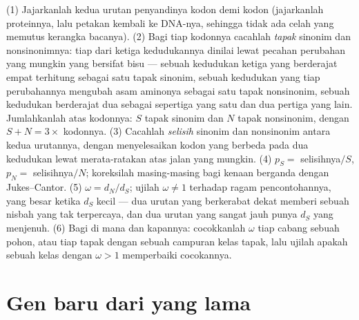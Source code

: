 \begin{method}[Menaksir $d_{N}/d_{S}$]\label{met:b3:molecular-evolution:method}
(1) Jajarkanlah kedua urutan penyandinya kodon demi kodon (jajarkanlah proteinnya,
lalu petakan kembali ke DNA-nya, sehingga tidak ada celah yang memutus kerangka bacanya).
(2) Bagi tiap kodonnya cacahlah \emph{tapak} sinonim dan nonsinonimnya:
tiap dari ketiga kedudukannya dinilai lewat pecahan perubahan yang mungkin
yang bersifat bisu --- sebuah kedudukan ketiga yang berderajat empat terhitung
sebagai satu tapak sinonim, sebuah kedudukan yang tiap perubahannya mengubah asam
aminonya sebagai satu tapak nonsinonim, sebuah kedudukan berderajat dua sebagai sepertiga yang satu dan
dua pertiga yang lain. Jumlahkanlah atas kodonnya: $S$ tapak sinonim dan $N$
tapak nonsinonim, dengan $S + N = 3 \times$ kodonnya. (3) Cacahlah
\emph{selisih} sinonim dan nonsinonim antara kedua urutannya,
dengan menyelesaikan kodon yang berbeda pada dua kedudukan lewat merata-ratakan atas
jalan yang mungkin. (4) $p_{S} = $ selisihnya$/S$, $p_{N} = $ selisihnya$/N$;
koreksilah masing-masing bagi kenaan berganda dengan Jukes--Cantor. (5) $\omega =
d_{N}/d_{S}$; ujilah $\omega \ne 1$ terhadap ragam pencontohannya, yang
besar ketika $d_{S}$ kecil --- dua urutan yang berkerabat dekat memberi
sebuah nisbah yang tak terpercaya, dan dua urutan yang sangat jauh punya
$d_{S}$ yang menjenuh. (6) Bagi di mana dan kapannya: cocokkanlah $\omega$ tiap cabang sebuah pohon, atau
tiap tapak dengan sebuah campuran kelas tapak, lalu ujilah apakah sebuah kelas dengan
$\omega > 1$ memperbaiki cocokannya.
\end{method}

\section{Gen baru dari yang lama}

